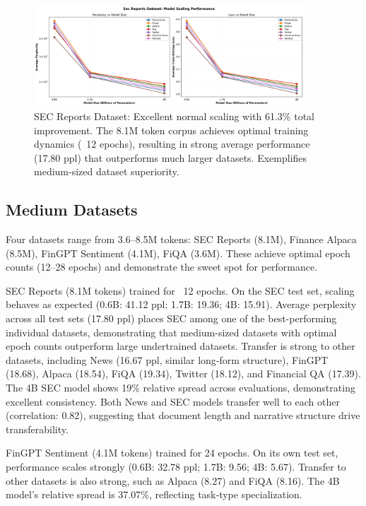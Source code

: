 \begin{figure}[htbp]
\centering
\includegraphics[width=0.9\textwidth]{figures/scaling_sec_reports.png}
\caption[SEC Reports Dataset: Scaling Behavior]{SEC Reports Dataset: Excellent normal scaling with 61.3\% total improvement. The 8.1M token corpus achieves optimal training dynamics (~12 epochs), resulting in strong average performance (17.80 ppl) that outperforms much larger datasets. Exemplifies medium-sized dataset superiority.}
\label{fig:scaling_sec_reports}
\end{figure}





\subsection{Medium Datasets}

Four datasets range from 3.6–8.5M tokens: SEC Reports (8.1M), Finance Alpaca (8.5M), FinGPT Sentiment (4.1M), FiQA (3.6M). These achieve optimal epoch counts (12–28 epochs) and demonstrate the sweet spot for performance.

SEC Reports (8.1M tokens) trained for ~12 epochs. On the SEC test set, scaling behaves as expected (0.6B: 41.12 ppl; 1.7B: 19.36; 4B: 15.91). Average perplexity across all test sets (17.80 ppl) places SEC among one of the best-performing individual datasets, demonstrating that medium-sized datasets with optimal epoch counts outperform large undertrained datasets. Transfer is strong to other datasets, including News (16.67 ppl, similar long‑form structure), FinGPT (18.68), Alpaca (18.54), FiQA (19.34), Twitter (18.12), and Financial QA (17.39). The 4B SEC model shows 19\% relative spread across evaluations, demonstrating excellent consistency. Both News and SEC models transfer well to each other (correlation: 0.82), suggesting that document length and narrative structure drive transferability.

FinGPT Sentiment (4.1M tokens) trained for 24 epochs. On its own test set, performance scales strongly (0.6B: 32.78 ppl; 1.7B: 9.56; 4B: 5.67). Transfer to other datasets is also strong, such as Alpaca (8.27) and FiQA (8.16). The 4B model's relative spread is 37.07\%, reflecting task‑type specialization.

